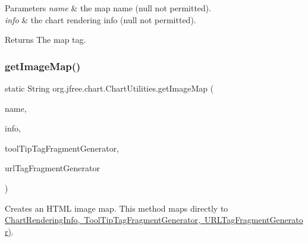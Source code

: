 \begin{DoxyParams}{Parameters}
{\em name} & the map name ({\ttfamily null} not permitted). \\
\hline
{\em info} & the chart rendering info ({\ttfamily null} not permitted).\\
\hline
\end{DoxyParams}
\begin{DoxyReturn}{Returns}
The map tag. 
\end{DoxyReturn}
\mbox{\label{classorg_1_1jfree_1_1chart_1_1_chart_utilities_a21022ade79935bce5d8b4b74070bfc4e}} 
\subsubsection{\texorpdfstring{get\+Image\+Map()}{getImageMap()}\hspace{0.1cm}{\footnotesize\ttfamily [2/2]}}
{\footnotesize\ttfamily static String org.\+jfree.\+chart.\+Chart\+Utilities.\+get\+Image\+Map (\begin{DoxyParamCaption}\item[{String}]{name,  }\item[{\mbox{\hyperlink{classorg_1_1jfree_1_1chart_1_1_chart_rendering_info}{Chart\+Rendering\+Info}}}]{info,  }\item[{\mbox{\hyperlink{interfaceorg_1_1jfree_1_1chart_1_1imagemap_1_1_tool_tip_tag_fragment_generator}{Tool\+Tip\+Tag\+Fragment\+Generator}}}]{tool\+Tip\+Tag\+Fragment\+Generator,  }\item[{\mbox{\hyperlink{interfaceorg_1_1jfree_1_1chart_1_1imagemap_1_1_u_r_l_tag_fragment_generator}{U\+R\+L\+Tag\+Fragment\+Generator}}}]{url\+Tag\+Fragment\+Generator }\end{DoxyParamCaption})\hspace{0.3cm}{\ttfamily [static]}}

Creates an H\+T\+ML image map. This method maps directly to \mbox{\hyperlink{}{Chart\+Rendering\+Info, Tool\+Tip\+Tag\+Fragment\+Generator, U\+R\+L\+Tag\+Fragment\+Generator)}}.


